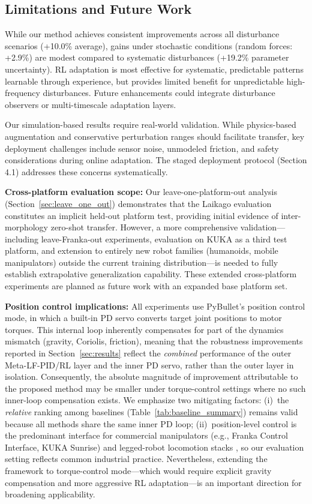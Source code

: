\documentclass[DTMColor]{ROB-New}
\begin{document}
\subsection{Limitations and Future Work}

While our method achieves consistent improvements across all disturbance scenarios (+10.0\% average), gains under stochastic conditions (random forces: +2.9\%) are modest compared to systematic disturbances (+19.2\% parameter uncertainty). RL adaptation is most effective for systematic, predictable patterns learnable through experience, but provides limited benefit for unpredictable high-frequency disturbances. Future enhancements could integrate disturbance observers or multi-timescale adaptation layers.

Our simulation-based results require real-world validation. While physics-based augmentation and conservative perturbation ranges should facilitate transfer, key deployment challenges include sensor noise, unmodeled friction, and safety considerations during online adaptation. The staged deployment protocol (Section 4.1) addresses these concerns systematically.

{\color{blue}\textbf{Cross-platform evaluation scope:} Our leave-one-platform-out analysis (Section~\ref{sec:leave_one_out}) demonstrates that the Laikago evaluation constitutes an implicit held-out platform test, providing initial evidence of inter-morphology zero-shot transfer. However, a more comprehensive validation---including leave-Franka-out experiments, evaluation on KUKA as a third test platform, and extension to entirely new robot families (humanoids, mobile manipulators) outside the current training distribution---is needed to fully establish extrapolative generalization capability. These extended cross-platform experiments are planned as future work with an expanded base platform set.}

{\color{blue}\textbf{Position control implications:}\label{para:position_control} All experiments use PyBullet's position control mode, in which a built-in PD servo converts target joint positions to motor torques. This internal loop inherently compensates for part of the dynamics mismatch (gravity, Coriolis, friction), meaning that the robustness improvements reported in Section~\ref{sec:results} reflect the \textit{combined} performance of the outer Meta-LF-PID/RL layer and the inner PD servo, rather than the outer layer in isolation. Consequently, the absolute magnitude of improvement attributable to the proposed method may be smaller under torque-control settings where no such inner-loop compensation exists. We emphasize two mitigating factors: (i)~the \textit{relative} ranking among baselines (Table~\ref{tab:baseline_summary}) remains valid because all methods share the same inner PD loop; (ii)~position-level control is the predominant interface for commercial manipulators (e.g., Franka Control Interface, KUKA Sunrise) and legged-robot locomotion stacks \cite{margolis2024rapid}, so our evaluation setting reflects common industrial practice. Nevertheless, extending the framework to torque-control mode---which would require explicit gravity compensation and more aggressive RL adaptation---is an important direction for broadening applicability.}
\end{document}
